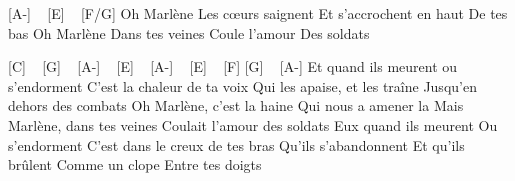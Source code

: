 [A-] ~ [E] ~ [F/G]
Oh Marlène
Les cœurs saignent
Et s'accrochent en haut
De tes bas
Oh Marlène
Dans tes veines
Coule l'amour
Des soldats

[C] ~ [G] ~ [A-] ~ [E] ~ [A-] ~ [E] ~ [F] [G] ~ [A-]
Et quand ils meurent ou s'endorment
C'est la chaleur de ta voix
Qui les apaise, et les traîne
Jusqu'en dehors des combats
Oh Marlène, c'est la haine
Qui nous a amener la
Mais Marlène, dans tes veines
Coulait l'amour des soldats
Eux quand ils meurent
Ou s'endorment
C'est dans le creux de tes bras
Qu'ils s'abandonnent
Et qu'ils brûlent
Comme un clope
Entre tes doigts

